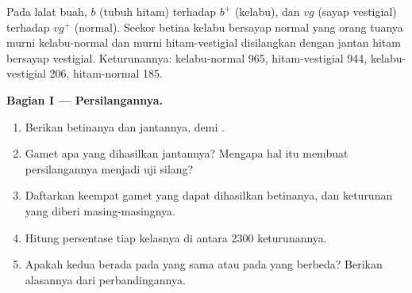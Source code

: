 \begin{problem}
\label{pb:g12:meiosis-genetic-shuffling:1}
Pada lalat buah,  $b$ (tubuh hitam)  terhadap $b^+$
(kelabu), dan $vg$ (sayap vestigial)  terhadap $vg^+$ (normal).
Seekor betina kelabu bersayap normal yang orang tuanya murni
kelabu-normal dan murni hitam-vestigial disilangkan dengan jantan hitam
bersayap vestigial. Keturunannya: kelabu-normal 965, hitam-vestigial
944, kelabu-vestigial 206, hitam-normal 185.

\medskip
\noindent\textbf{Bagian I --- Persilangannya.}
\begin{enumerate}
  \item Berikan  betinanya dan  jantannya,  demi .
  \item Gamet apa yang dihasilkan jantannya? Mengapa hal itu membuat
        persilangannya menjadi uji silang?
  \item Daftarkan keempat gamet yang dapat dihasilkan betinanya, dan
        keturunan yang diberi masing-masingnya.
  \item Hitung persentase tiap kelasnya di antara 2300 keturunannya.
  \item Apakah kedua  berada pada  yang sama atau pada
         yang berbeda? Berikan alasannya dari perbandingannya.
\end{enumerate}


\end{problem}
